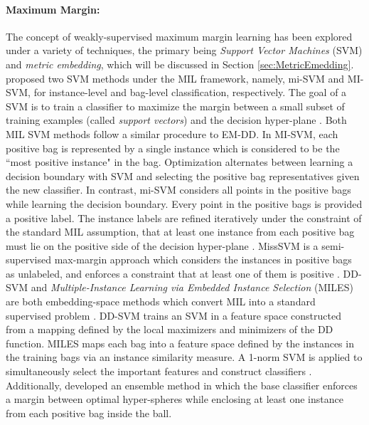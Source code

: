 \paragraph{Maximum Margin:}
The concept of weakly-supervised maximum margin learning has been explored under a variety of techniques, the primary being \textit{Support Vector Machines} (SVM) and \textit{metric embedding}, which will be discussed in Section \ref{sec:MetricEmedding}.  \cite{Andrews2011MISVM} proposed two SVM methods under the MIL framework, namely, mi-SVM and MI-SVM, for instance-level and bag-level classification,  respectively.  The goal of a SVM is to train a classifier to maximize the margin between a small subset of training examples (called \textit{support vectors}) and the decision hyper-plane \citep{Murphy2012}.  Both MIL SVM methods follow a similar procedure to EM-DD.  In MI-SVM, each positive bag is represented by a single instance which is considered to be the ``most positive instance" in the bag. Optimization alternates between learning a decision boundary with SVM and selecting the positive bag representatives given the new classifier. In contrast, mi-SVM considers all points in the positive bags while learning the decision boundary.  Every point in the positive bags is provided a positive label.  The instance labels are refined iteratively under the constraint of the standard MIL assumption, that at least one instance from each positive bag must lie on the positive side of the decision hyper-plane \citep{Cao2016VehicleDetectionMIL}.  MissSVM is a semi-supervised max-margin approach which considers the instances in positive bags as unlabeled, and enforces a constraint that at least one of them is positive \citep{Zhou2007MissSVM}.  DD-SVM  and \textit{Multiple-Instance Learning via Embedded Instance Selection} (MILES) are both embedding-space methods which convert MIL into a standard supervised problem \citep{Chen2006MILES}.  DD-SVM trains an SVM in a feature space constructed from a mapping defined by the local maximizers and minimizers of the DD function.  MILES maps each bag into a feature space defined by the instances in the training bags via an instance similarity measure. A 1-norm SVM is applied to simultaneously select the important features and construct classifiers \citep{RuizMunoz2015MILBirdsongClassification}. Additionally, \cite{Xiao2017SphereMIL} developed an ensemble method in which the base classifier enforces a margin between optimal hyper-spheres while enclosing at least one instance from each positive bag inside the ball. 


